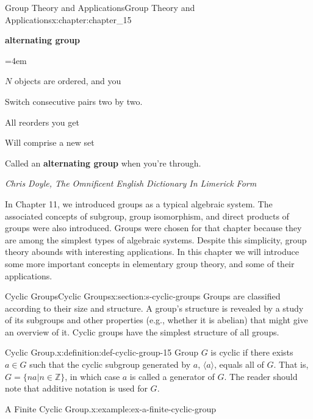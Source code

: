 \documentclass[oneside,10pt,]{book}
\newcommand{\terminology}[1]{\textbf{#1}}
\numberwithin{equation}{section}
\newenvironment{poem}{\setlength{\parindent}{0em}}{}
\newcommand{\poemTitle}[1]{\begin{center}\large\textbf{#1}\end{center}}
\newenvironment{stanza}{\vspace{0.25 em}\hangindent=4em}{\vspace{1 em}}
\newcommand{\poemauthorleft}[1]{\vspace{-1em}\begin{flushleft}\textit{#1}\end{flushleft}}
\newcommand{\poemlineleft}[1]{{\raggedright{#1}\par}\vspace{-\parskip}}
\begin{document}
%
%
\typeout{************************************************}
\typeout{************************************************}
%
\begin{chapterptx}{Group Theory and Applications}{}{Group Theory and Applications}{}{}{x:chapter:chapter_15}
\begin{introduction}{}%
\begin{poem}%
\poemTitle{alternating group}
\begin{stanza}
\poemlineleft{\(N\) objects are ordered, and you}
\poemlineleft{Switch consecutive pairs two by two.}
\poemlineleft{All reorders you get}
\poemlineleft{Will comprise a new set}
\poemlineleft{Called an \terminology{alternating group} when you're through.}
\end{stanza}
\poemauthorleft{Chris Doyle, The Omnificent English Dictionary In Limerick Form}
\end{poem}
In Chapter 11, we introduced groups as a typical algebraic system. The associated concepts of subgroup, group isomorphism, and direct products of groups were also introduced. Groups were chosen for that chapter because they are among the simplest types of algebraic systems. Despite this simplicity, group theory abounds with interesting applications. In this chapter we will introduce some more important concepts in elementary group theory, and some of their applications.%
\end{introduction}%
%
%
\typeout{************************************************}
\typeout{************************************************}
%
\begin{sectionptx}{Cyclic Groups}{}{Cyclic Groups}{}{}{x:section:s-cyclic-groups}
Groups are classified according to their size and structure. A group's structure is revealed by a study of its subgroups and other properties (e.g., whether it is abelian) that might give an overview of it. Cyclic groups have the simplest structure of all groups.%
\begin{definition}{Cyclic Group.}{x:definition:def-cyclic-group-15}%
%
\label{g:notation:idm546593740256}%
Group \(G\) is cyclic if there exists \(a \in  G\) such that the cyclic subgroup generated by \(a\), \(\langle a \rangle\), equals all of \(G\). That is, \(G = \{n a |n \in  \mathbb{Z}\}\), in which case \(a\) is called a generator of \(G\). The reader should note that additive notation is used for \(G\).%
\end{definition}
\begin{example}{A Finite Cyclic Group.}{x:example:ex-a-finite-cyclic-group}%

\end{example}
\end{sectionptx}
\end{chapterptx}
\end{document}
